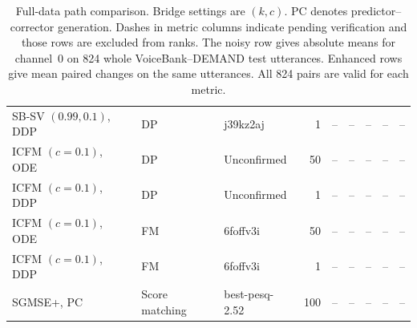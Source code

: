 \begin{table}[htbp]
{\begin{tabular}{lllrrrrrr}
SB-SV $(0.99,0.1)$, DDP & DP & j39kz2aj & 1 & -- & -- & -- & -- & -- \\
ICFM $(c=0.1)$, ODE & DP & Unconfirmed & 50 & -- & -- & -- & -- & -- \\
ICFM $(c=0.1)$, DDP & DP & Unconfirmed & 1 & -- & -- & -- & -- & -- \\
ICFM $(c=0.1)$, ODE & FM & 6foffv3i & 50 & -- & -- & -- & -- & -- \\
ICFM $(c=0.1)$, DDP & FM & 6foffv3i & 1 & -- & -- & -- & -- & -- \\
SGMSE+, PC & Score matching & best-pesq-2.52 & 100 & -- & -- & -- & -- & -- \\
\bottomrule\end{tabular}}
\caption{Full-data path comparison. Bridge settings are $(k,c)$. PC denotes predictor--corrector generation. Dashes in metric columns indicate pending verification and those rows are excluded from ranks. The noisy row gives absolute means for channel~0 on 824 whole VoiceBank--DEMAND test utterances. Enhanced rows give mean paired changes on the same utterances. All 824 pairs are valid for each metric.}\label{tab:cfmse-local}
\end{table}
